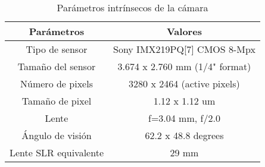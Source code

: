 \begin{table}[H]
	\begin{center}
		\begin{tabular}{|c|c|}
			\hline
			\textbf{Parámetros}   & \textbf{Valores}               \\
			\hline
			Tipo de sensor        & Sony IMX219PQ[7] CMOS 8-Mpx    \\
			Tamaño del sensor     & 3.674 x 2.760 mm (1/4" format) \\
			Número de pixels      & 3280 x 2464 (active pixels)    \\
			Tamaño de pixel       & 1.12 x 1.12 um                 \\
			Lente                 & f=3.04 mm, f/2.0               \\
			Ángulo de visión      & 62.2 x 48.8 degrees            \\
			Lente SLR equivalente & 29 mm                          \\
			\hline
		\end{tabular}
		\caption{Parámetros intrínsecos de la cámara}
		\label{cuadro:ejemplo}
	\end{center}
\end{table}

